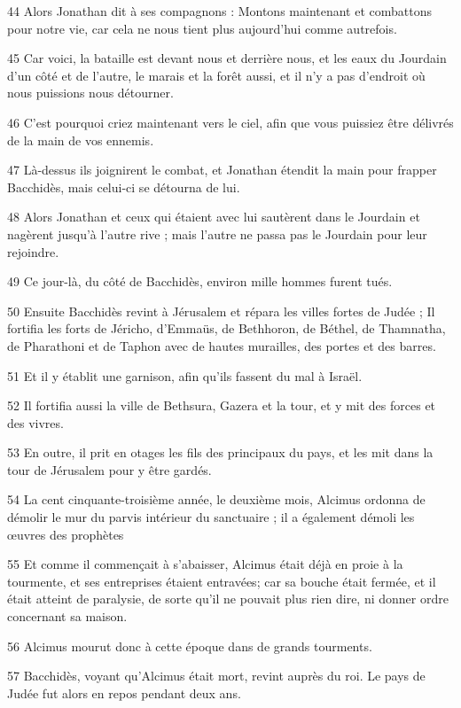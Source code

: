 \par 44 Alors Jonathan dit à ses compagnons : Montons maintenant et combattons pour notre vie, car cela ne nous tient plus aujourd'hui comme autrefois.
\par 45 Car voici, la bataille est devant nous et derrière nous, et les eaux du Jourdain d'un côté et de l'autre, le marais et la forêt aussi, et il n'y a pas d'endroit où nous puissions nous détourner.
\par 46 C'est pourquoi criez maintenant vers le ciel, afin que vous puissiez être délivrés de la main de vos ennemis.
\par 47 Là-dessus ils joignirent le combat, et Jonathan étendit la main pour frapper Bacchidès, mais celui-ci se détourna de lui.
\par 48 Alors Jonathan et ceux qui étaient avec lui sautèrent dans le Jourdain et nagèrent jusqu'à l'autre rive ; mais l'autre ne passa pas le Jourdain pour leur rejoindre.
\par 49 Ce jour-là, du côté de Bacchidès, environ mille hommes furent tués.
\par 50 Ensuite Bacchidès revint à Jérusalem et répara les villes fortes de Judée ; Il fortifia les forts de Jéricho, d'Emmaüs, de Bethhoron, de Béthel, de Thamnatha, de Pharathoni et de Taphon avec de hautes murailles, des portes et des barres.
\par 51 Et il y établit une garnison, afin qu'ils fassent du mal à Israël.
\par 52 Il fortifia aussi la ville de Bethsura, Gazera et la tour, et y mit des forces et des vivres.
\par 53 En outre, il prit en otages les fils des principaux du pays, et les mit dans la tour de Jérusalem pour y être gardés.
\par 54 La cent cinquante-troisième année, le deuxième mois, Alcimus ordonna de démolir le mur du parvis intérieur du sanctuaire ; il a également démoli les œuvres des prophètes
\par 55 Et comme il commençait à s'abaisser, Alcimus était déjà en proie à la tourmente, et ses entreprises étaient entravées; car sa bouche était fermée, et il était atteint de paralysie, de sorte qu'il ne pouvait plus rien dire, ni donner ordre concernant sa maison.
\par 56 Alcimus mourut donc à cette époque dans de grands tourments.
\par 57 Bacchidès, voyant qu'Alcimus était mort, revint auprès du roi. Le pays de Judée fut alors en repos pendant deux ans.
